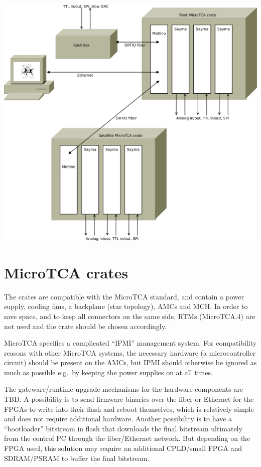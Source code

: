 \documentclass[11pt]{paper}
\begin{document}
\includegraphics[width=\textwidth]{overview.pdf}

\section{MicroTCA crates}
The crates are compatible with the MicroTCA standard, and contain a power supply, cooling fans, a backplane (star topology), AMCs and MCH. In order to save space, and to keep all connectors on the same side, RTMs (MicroTCA.4) are not used and the crate should be chosen accordingly.

MicroTCA specifies a complicated ``IPMI'' management system. For compatibility reasons with other MicroTCA systems, the necessary hardware (a microcontroller circuit) should be present on the AMCs, but IPMI should otherwise be ignored as much as possible e.g.\ by keeping the power supplies on at all times.

The gateware/runtime upgrade mechanisms for the hardware components are TBD. A possibility is to send firmware binaries over the fiber or Ethernet for the FPGAs to write into their flash and reboot themselves, which is relatively simple and does not require additional hardware. Another possibility is to have a ``bootloader'' bitstream in flash that downloads the final bitstream ultimately from the control PC through the fiber/Ethernet network. But depending on the FPGA used, this solution may require an additional CPLD/small FPGA and SDRAM/PSRAM to buffer the final bitstream.
\end{document}
